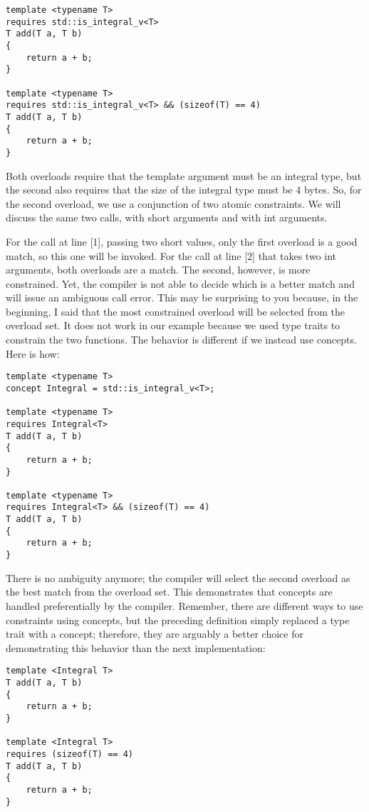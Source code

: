 \begin{lstlisting}[style=styleCXX]
template <typename T>
requires std::is_integral_v<T>
T add(T a, T b)
{
	return a + b;
}

template <typename T>
requires std::is_integral_v<T> && (sizeof(T) == 4)
T add(T a, T b)
{
	return a + b;
}
\end{lstlisting}

Both overloads require that the template argument must be an integral type, but the second also requires that the size of the integral type must be 4 bytes. So, for the second overload, we use a conjunction of two atomic constraints. We will discuss the same two calls, with short arguments and with int arguments.

For the call at line [1], passing two short values, only the first overload is a good match, so this one will be invoked. For the call at line [2] that takes two int arguments, both overloads are a match. The second, however, is more constrained. Yet, the compiler is not able to decide which is a better match and will issue an ambiguous call error. This may be surprising to you because, in the beginning, I said that the most constrained overload will be selected from the overload set. It does not work in our example because we used type traits to constrain the two functions. The behavior is different if we instead use concepts.
Here is how:

\begin{lstlisting}[style=styleCXX]
template <typename T>
concept Integral = std::is_integral_v<T>;

template <typename T>
requires Integral<T>
T add(T a, T b)
{
	return a + b;
}

template <typename T>
requires Integral<T> && (sizeof(T) == 4)
T add(T a, T b)
{
	return a + b;
}
\end{lstlisting}

There is no ambiguity anymore; the compiler will select the second overload as the best match from the overload set. This demonstrates that concepts are handled preferentially by the compiler. Remember, there are different ways to use constraints using concepts, but the preceding definition simply replaced a type trait with a concept; therefore, they are arguably a better choice for demonstrating this behavior than the next implementation:

\begin{lstlisting}[style=styleCXX]
template <Integral T>
T add(T a, T b)
{
	return a + b;
}

template <Integral T>
requires (sizeof(T) == 4)
T add(T a, T b)
{
	return a + b;
}
\end{lstlisting}

